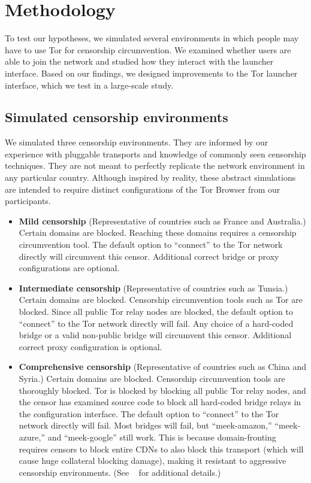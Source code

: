 \documentclass{template}
\begin{document}
\section{Methodology}

To test our hypotheses, we simulated several environments in which people may
have to use Tor for censorship circumvention. We examined whether users are able
to join the network and studied how they interact with the launcher interface.
Based on our findings, we designed improvements to the Tor launcher interface,
which we test in a large-scale study.

\subsection{Simulated censorship environments}
We simulated three censorship environments.
They are informed by our experience with pluggable transports
and knowledge of commonly seen censorship techniques.
They are not meant to perfectly replicate the network environment
in any particular country. Although inspired by reality, these
abstract simulations are intended to require distinct configurations
of the Tor Browser from our participants.

\begin{itemize} \itemsep1pt \parskip0pt 
\item {\bfseries Mild censorship} 
(Representative of countries such as France and Australia.)
Certain domains are blocked. Reaching these 
domains requires a censorship circumvention 
tool. The default option to ``connect'' to the Tor network 
directly will circumvent this censor. Additional correct
bridge or proxy configurations are optional. 

\item {\bfseries Intermediate censorship} 
(Representative of countries such as Tunsia.)
Certain domains are blocked. Censorship circumvention
tools such as Tor are blocked. Since all public Tor
relay nodes are blocked, the default option to ``connect'' to the Tor network
directly will fail. Any choice of a hard-coded bridge
or a valid non-public bridge will circumvent this censor.  
Additional correct proxy configuration is optional.

\item {\bfseries Comprehensive censorship} 
(Representative of countries such as China and Syria.)
Certain domains are blocked. Censorship circumvention tools
are thoroughly blocked. Tor is blocked by blocking all public
Tor relay nodes, and the censor has examined source code to block
all hard-coded bridge relays in the configuration interface. The default option
to ``connect'' to the Tor network directly will fail. Most bridges will fail,
but ``meek-amazon,'' ``meek-azure,'' and ``meek-google'' still work.
This is because domain-fronting requires censors to block entire CDNs to also
block this transport (which will cause huge collateral blocking damage), making
it resistant to aggressive censorship environments.
(See ~\cite{fifield2015blocking} for additional details.)\\
\end{itemize}
\end{document}
